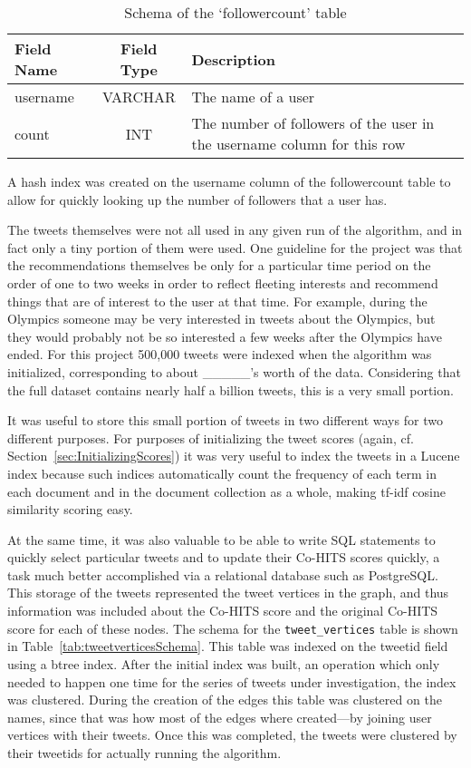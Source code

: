 \begin{table}
\centering
\begin{tabular}{l|c|p{8cm}}
{\bf Field Name} & {\bf Field Type} & {\bf Description} \\ \hline
username & VARCHAR & The name of a user \\ \hline
count & INT & The number of followers of the user in the username column for this row \\
\end{tabular}
\caption{Schema of the `followercount' table}
\label{tab:followercountSchema}
\end{table}

\noindent
A hash index was created on the username column of the followercount table to allow for quickly looking up the number of followers that a user has.

The tweets themselves were not all used in any given run of the algorithm, and in fact only a tiny portion of them were used. One guideline for the project was that the recommendations themselves be only for a particular time period on the order of one to two weeks in order to reflect fleeting interests and recommend things that are of interest to the user at that time. For example, during the Olympics someone may be very interested in tweets about the Olympics, but they would probably not be so interested a few weeks after the Olympics have ended. For this project 500,000 tweets were indexed when the algorithm was initialized, corresponding to about \_\_\_\_\_'s worth of the data. Considering that the full dataset contains nearly half a billion tweets, this is a very small portion.

It was useful to store this small portion of tweets in two different ways for two different purposes. For purposes of initializing the tweet scores (again, cf. Section~\ref{sec:InitializingScores}) it was very useful to index the tweets in a Lucene index because such indices automatically count the frequency of each term in each document and in the document collection as a whole, making tf-idf cosine similarity scoring easy.

At the same time, it was also valuable to be able to write SQL statements to quickly select particular tweets and to update their Co-HITS scores quickly, a task much better accomplished via a relational database such as PostgreSQL. This storage of the tweets represented the tweet vertices in the graph, and thus information was included about the Co-HITS score and the original Co-HITS score for each of these nodes. The schema for the \texttt{tweet\_vertices} table is shown in Table~\ref{tab:tweetverticesSchema}. This table was indexed on the tweetid field using a btree index. After the initial index was built, an operation which only needed to happen one time for the series of tweets under investigation, the index was clustered. During the creation of the edges this table was clustered on the names, since that was how most of the edges where created---by joining user vertices with their tweets. Once this was completed, the tweets were clustered by their tweetids for actually running the algorithm.

